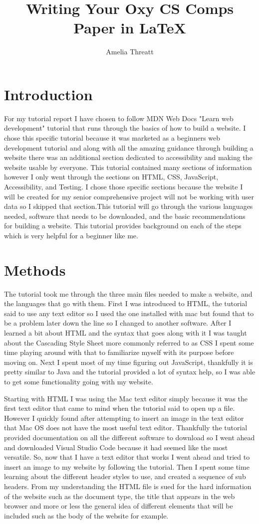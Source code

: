 \documentclass[10pt,twocolumn]{article}
\title{Writing Your Oxy CS Comps Paper in \LaTeX}
\author{Amelia Threatt}
\affiliation{Occidental College}
\begin{document}
\maketitle
\section{Introduction}
For my tutorial report I have chosen to follow MDN Web Docs "Learn web development" tutorial that runs through the basics of how to build a website. I chose this specific tutorial because it was marketed as a beginners web development tutorial and along with all the amazing guidance through building a website there was an additional section dedicated to accessibility and making the website usable by everyone. This tutorial contained many sections of information however I only went through the sections on HTML, CSS, JavaScript, Accessibility, and Testing. I chose those specific sections because the website I will be created for my senior comprehensive project will not be working with user data so I skipped that section.This tutorial will go through the various languages needed, software that needs to be downloaded, and the basic recommendations for building a website. This tutorial provides background on each of the steps which is very helpful for a beginner like me. 

\section{Methods}
The tutorial took me through the three main files needed to make a website, and the languages that go with them. First I was introduced to HTML, the tutorial said to use any text editor so I used the one installed with mac but found that to be a problem later down the line so I changed to another software. After I learned a bit about HTML and the syntax that goes along with it I was taught about the Cascading Style Sheet more commonly referred to as CSS I spent some time playing around with that to familiarize myself with its purpose before moving on. Next I spent most of my time figuring out JavaScript, thankfully it is pretty similar to Java and the tutorial provided a lot of syntax help, so I was able to get some functionality going with my website.

Starting with HTML I was using the Mac text editor simply because it was the first text editor that came to mind when the tutorial said to open up a file. However I quickly found after attempting to insert an image in the text editor that Mac OS does not have the most useful text editor. Thankfully the tutorial provided documentation on all the different software to download so I went ahead and downloaded Visual Studio Code because it had seemed like the most versatile. So, now that I have a text editor that works I went ahead and tried to insert an image to my website by following the tutorial. Then I spent some time learning about the different header styles to use, and created a sequence of sub headers. From my understanding the HTML file is sued for the hard information of the website such as the document type, the title that appears in the web browser and more or less the general idea of different elements that will be included such as the body of the website for example. 
\end{document}
